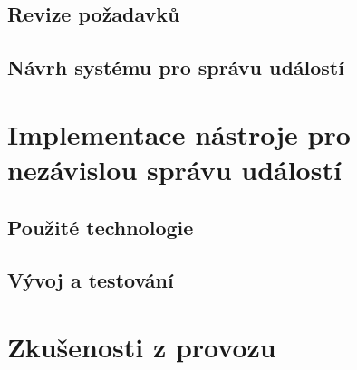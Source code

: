 \documentclass[12pt,oneside,final]{fithesis2}
\begin{document}
\section{Revize požadavků}

\section{Návrh systému pro správu událostí}




\chapter{Implementace nástroje pro nezávislou správu událostí}

\section{Použité technologie}

\section{Vývoj a testování}



\chapter{Zkušenosti z provozu}
\end{document}
